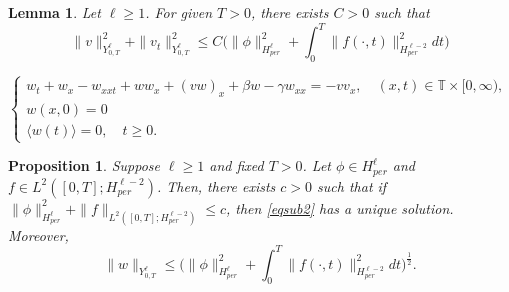 \documentclass[10pt,a4paper]{amsart}
\newtheorem{lemma}{Lemma}
\newtheorem{prop}{Proposition}
\newcommand{\Gb}{\beta}
\newcommand{\Gg}{\gamma}
\newcommand{\bT}{\mathbb{T}}
\begin{document}
\begin{lemma}\label{estu}
    Let $\ell\geq 1$. For given $T>0$, there exists $C>0$ such that 
    $$\|v\|^2_{Y^{\ell}_{0,T}}+\|v_t\|^2_{Y^{\ell}_{0,T}}\leq C\bigg(\|\phi\|^2_{H^{\ell}_{per}}+\int_0^T\|f(\cdot,t)\|_{H^{\ell-2}_{per}}^2dt\bigg)$$
\end{lemma}

\begin{equation}\label{eqsub2}
\begin{cases}
    w_t+w_x-w_{xxt}+ww_x+(vw)_x+\Gb w-\Gg w_{xx}=-vv_x,  \quad (x, t)\in \bT\times [0, \infty),&\\
    w(x,0)=0&\\
    \langle w(t)\rangle =0, \quad t\geq 0.&
    \end{cases}
\end{equation}

\begin{prop} \label{estw}
 Suppose $\ell\geq 1$ and fixed $T>0
 $. Let $\phi\in H^{\ell}_{per}$ and $f\in L^2([0,T];H^{\ell-2}_{per})$. Then, there exists $c>0$ such that if $\|\phi\|_{H^{\ell}_{per}}^2+\|f\|_{L^2([0,T];H^{\ell-2}_{per})}\leq c$, then \eqref{eqsub2} has a unique solution. Moreover, 
 $$\|w\|_{Y^{\ell}_{0,T}}\leq \bigg(\|\phi\|_{H^{\ell}_{per}}^2+\int_0^T\|f(\cdot,t)\|_{H^{\ell-2}_{per}}^2dt\bigg)^{\frac12}.$$
\end{prop}
\end{document}
